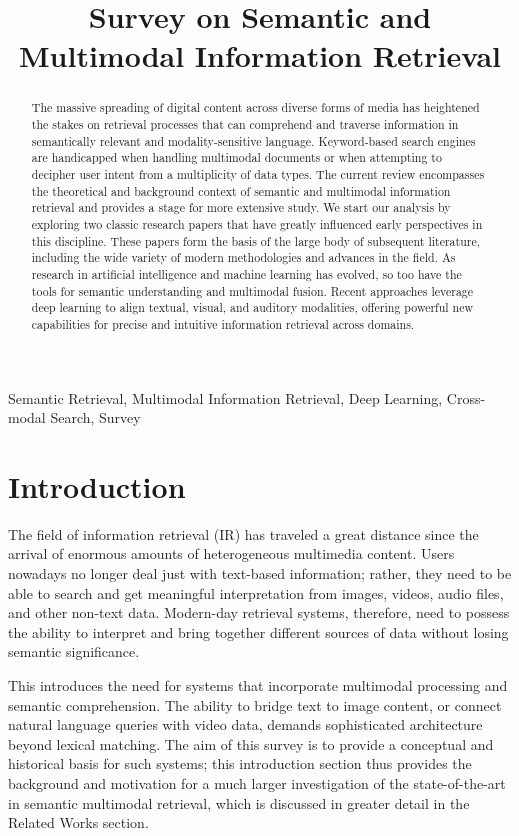 \documentclass[conference]{IEEEtran}
\title{Survey on Semantic and Multimodal Information Retrieval}
\author{}
\begin{document}
\maketitle



\begin{abstract}
The massive spreading of digital content across diverse forms of media has heightened the stakes on retrieval processes that can comprehend and traverse information in semantically relevant and modality-sensitive language. Keyword-based search engines are handicapped when handling multimodal documents or when attempting to decipher user intent from a multiplicity of data types. The current review encompasses the theoretical and background context of semantic and multimodal information retrieval and provides a stage for more extensive study. We start our analysis by exploring two classic research papers that have greatly influenced early perspectives in this discipline. These papers form the basis of the large body of subsequent literature, including the wide variety of modern methodologies and advances in the field. As research in artificial intelligence and machine learning has evolved, so too have the tools for semantic understanding and multimodal fusion. Recent approaches leverage deep learning to align textual, visual, and auditory modalities, offering powerful new capabilities for precise and intuitive information retrieval across domains.
\end{abstract}

\begin{IEEEkeywords}
Semantic Retrieval, Multimodal Information Retrieval, Deep Learning, Cross-modal Search, Survey
\end{IEEEkeywords}

\section{Introduction}
The field of information retrieval (IR) has traveled a great distance since the arrival of enormous amounts of heterogeneous multimedia content. Users nowadays no longer deal just with text-based information; rather, they need to be able to search and get meaningful interpretation from images, videos, audio files, and other non-text data. Modern-day retrieval systems, therefore, need to possess the ability to interpret and bring together different sources of data without losing semantic significance.

This introduces the need for systems that incorporate multimodal processing and semantic comprehension. The ability to bridge text to image content, or connect natural language queries with video data, demands sophisticated architecture beyond lexical matching. The aim of this survey is to provide a conceptual and historical basis for such systems; this introduction section thus provides the background and motivation for a much larger investigation of the state-of-the-art in semantic multimodal retrieval, which is discussed in greater detail in the Related Works section.
\end{document}
